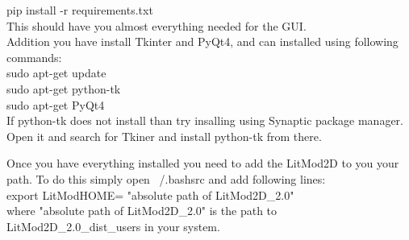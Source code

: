 \documentclass[14pt]{article}
\begin{document}
pip install -r requirements.txt\\

This should have you almost everything needed for the GUI.\\
Addition you have install Tkinter and PyQt4, and can installed using following commands: \\
sudo apt-get update  \\
sudo apt-get python-tk \\
sudo apt-get PyQt4 \\

If python-tk does not install than try insalling using Synaptic package manager. Open it and search for Tkiner and install python-tk from there.



Once you have everything installed you need to add the LitMod2D to you your path. To do this simply open ~/.bashsrc and add following lines:\\
export LitModHOME= "absolute path of LitMod2D\_2.0" \\
where "absolute path of LitMod2D\_2.0" is the path to LitMod2D\_2.0\_dist\_users in your system.


 
  





 
\end{document}

